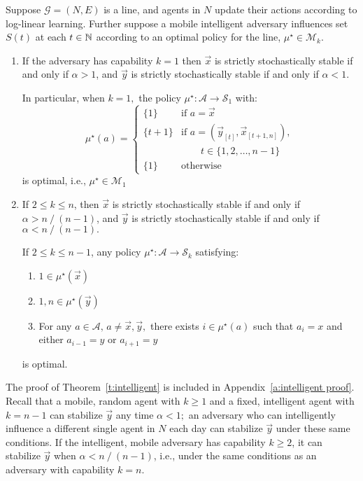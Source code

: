 \begin{Theorem}\label{t:intelligent}
Suppose $\mathcal{G} = (N,E)$ is a line, and agents in $N$ update their actions according to log-linear learning. Further suppose a mobile intelligent adversary influences set $S(t)$ at each $t\in \mathbb{N}$ according to an optimal policy for the line, $\mu^\star\in \mathcal{M}_k$. 
\begin{enumerate}%
\item If the adversary has capability $k = 1$ then $\vec{x}$ is strictly stochastically stable if and only if $\alpha > 1$, and $\vec{y}$ is strictly stochastically stable if and only if $\alpha <1.$

In particular, when $k=1,$ the policy $\mu^\star:\mathcal{A}\to\mathcal{S}_1$ with:
\begin{equation}\label{e:mustar 1}
\mu^\star(a) = 
\begin{cases}
\{1\} 		&\text{if } a = \vec{x}\\
\{t+1\}		&\text{if } a = (\vec{y}_{[t]},\vec{x}_{[t+1,n]}), \\&\quad\quad t\in \{1,2,\ldots,n-1\}\\
\{1\}			&\text{otherwise}
\end{cases}	
\end{equation}
is optimal, i.e., $\mu^\star\in \mathcal{M}_1$

\item If $2\leq k\leq n$, then $\vec{x}$ is strictly stochastically stable if and only if $\alpha > {n\mathop{/}(n-1)}$, and $\vec{y}$ is strictly stochastically stable if and only if $\alpha < {n\mathop{/} (n-1)}.$


If $2\leq k\leq n-1$, any policy $\mu^\star:\mathcal{A}\to\mathcal{S}_k$ satisfying:
\begin{enumerate}%
\item $1\in\mu^\star(\vec{x})$
\item $1,n\in\mu^\star(\vec{y})$
\item For any $a\in\mathcal{A},\,a\neq \vec{x},\vec{y},$ there exists $i\in \mu^\star(a)$ such that $a_i = x$ and either $a_{i-1} = y$ or $a_{i+1} = y$
\end{enumerate}
is optimal.

\end{enumerate}
\end{Theorem}

The proof of Theorem~\ref{t:intelligent} is included in Appendix~\ref{a:intelligent proof}. Recall that a mobile, random agent with $k\geq 1$ and a fixed, intelligent agent with $k = n-1$ can stabilize $\vec{y}$ any time $\alpha <1;$ an adversary who can intelligently influence a different single agent in $N$ each day can stabilize $\vec{y}$ under these same conditions.  If the intelligent, mobile adversary has capability $k\geq 2$, it can stabilize $ \vec{y}$ when $\alpha < {n\mathop{/} (n-1)}$, i.e., under the same conditions as an adversary with capability $k=n.$

